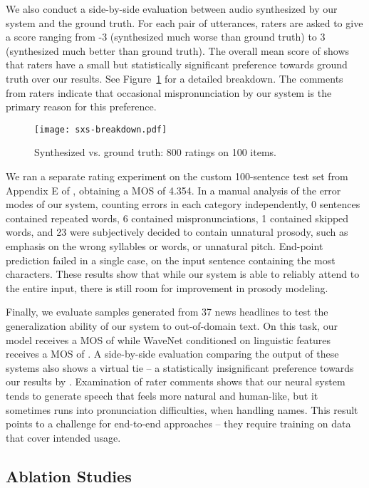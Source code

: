 We also conduct a side-by-side evaluation between audio synthesized by
our system and the ground truth.
For each pair of utterances, raters are asked to give a score ranging from -3
(synthesized much worse than ground truth) to 3 (synthesized much better than
ground truth).
The overall mean score of  shows that raters have a small but
statistically significant preference towards ground truth over our results.
See Figure~\ref{fig:sxs_breakdown} for a detailed breakdown.
The comments from raters indicate that occasional mispronunciation by our
system is the primary reason for this preference.

\begin{figure}[H]
\centering
\texttt{[image: sxs-breakdown.pdf]}
\caption{Synthesized vs. ground truth: 800 ratings on 100 items.}
\label{fig:sxs_breakdown}
\end{figure}

We ran a separate rating experiment on the custom 100-sentence test set from
Appendix E of \cite{2017arXiv171007654P}, obtaining a MOS of 4.354.
In a manual analysis of the error modes of our system, counting errors in
each category independently, 0 sentences contained repeated words,
6 contained mispronunciations, 1 contained skipped words, and 23 were
subjectively decided to contain unnatural prosody, such as emphasis on the
wrong syllables or words, or unnatural pitch. End-point prediction failed in a
single case, on the input sentence containing the most characters.
These results show that while our system is able to reliably attend to the
entire input, there is still room for improvement in prosody modeling.

Finally, we evaluate samples generated from 37 news headlines to test the
generalization ability of our system to out-of-domain text. On this task, our
model receives a MOS of  while WaveNet conditioned on
linguistic features receives a MOS of .
A side-by-side evaluation comparing the output of these systems also
shows a virtual tie -- a statistically insignificant preference towards our
results by . Examination of rater comments shows that our
neural system tends to generate speech that feels more natural and human-like,
but it sometimes runs into pronunciation difficulties, \eg when
handling names. This result points to a challenge for end-to-end
approaches -- they require training on data that cover intended usage.

\subsection{Ablation Studies}
\label{sec:ablation}

